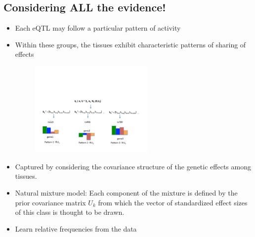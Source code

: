\documentclass[10pt,letterpaper]{article}
\begin{document}
\subsection{Considering ALL the evidence!}
\begin{itemize}
\item Each eQTL may follow a particular pattern of activity %
\item Within these groups, the tissues exhibit characteristic patterns of sharing of effects %
 \begin{figure}
\includegraphics[width=6cm]{hm.pdf}
\end{figure}
\item Captured by considering the covariance structure of the genetic effects among tissues. 
\item Natural mixture model: Each component of the mixture is defined by the prior covariance matrix $U_{k}$ from which the vector of standardized effect sizes of this class is thought to be drawn. 
\item Learn relative frequencies from the data
\end{itemize}%
\end{document}
